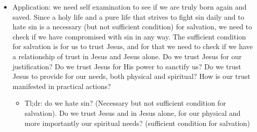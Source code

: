\begin{itemize}
  \item{Application: we need self examination to see if we are truly born again and saved. Since a holy life and a pure life that strives to fight sin daily and to hate sin is a necessary (but not sufficient condition) for salvation, we need to check if we have compromised with sin in any way. The sufficient condition for salvation is for us to trust Jesus, and for that we need to check if we have a relationship of trust in Jesus and Jesus alone. Do we trust Jesus for our justification? Do we trust Jesus for His power to sanctify us? Do we trust Jesus to provide for our needs, both physical and spiritual? How is our trust manifested in practical actions?
  \begin{itemize}
    \item{Tl;dr: do we hate sin? (Necessary but not sufficient condition for salvation). Do we trust Jesus and in Jesus alone, for our physical and more importantly our spiritual needs? (sufficient condition for salvation)}
  \end{itemize} }
\end{itemize}